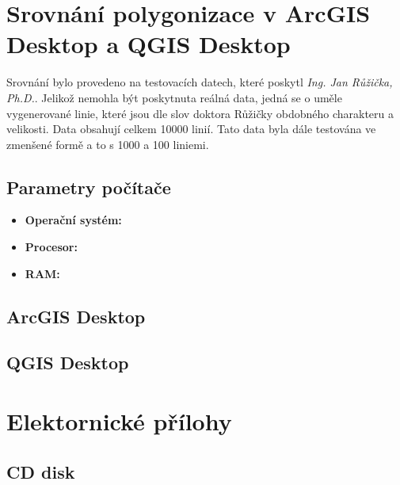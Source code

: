 \chapter{Srovnání polygonizace v ArcGIS Desktop a QGIS Desktop}
\label{chap:srovnani}
Srovnání bylo provedeno na testovacích datech, které poskytl \textit{Ing. Jan Růžička, Ph.D.}. Jelikož nemohla být poskytnuta reálná data, jedná se o uměle vygenerované linie, které jsou dle slov doktora Růžičky obdobného charakteru a velikosti. Data obsahují celkem 10000 linií. Tato data byla dále testována ve zmenšené formě a to s 1000 a 100 liniemi.

\section{Parametry počítače}
\begin{itemize}
\item \textbf{Operační systém:} 
\item \textbf{Procesor:} 
\item \textbf{RAM:} 
\end{itemize}

\section{ArcGIS Desktop}

\section{QGIS Desktop}


\chapter{Elektornické přílohy}
\label{user-guide}

\section{CD disk}

\label{app:cd}
    
